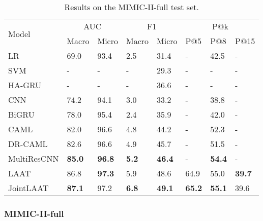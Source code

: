 \documentclass{article}
\begin{document}
\begingroup
\setlength{\tabcolsep}{2.5pt} \renewcommand{\arraystretch}{1.1} \begin{table}[!t]

\centering\small
\begin{tabular}{l|ll|ll|lll}
\hline
 \multirow{2}{*}{{Model}} &
 \multicolumn{2}{c|}{{AUC}} & \multicolumn{2}{c|}{{F1}} & \multicolumn{3}{c}{{P@k}} \\ \cline{2-8}

 &   Macro     & Micro &    Macro &     Micro & P@5 &  P@8 & P@15 \\ \hline
LR & 69.0 & 93.4 & 2.5 & 31.4 & - & 42.5 & - \\
SVM& - & - & - & 29.3 & - & - & - \\\hline
HA-GRU & - & - & - & 36.6 & - & - & - \\
CNN & 74.2 & 94.1 & 3.0 & 33.2 & - & 38.8 & - \\
BiGRU & 78.0 & 95.4 & 2.4 & 35.9 & - & 42.0 & - \\
CAML & 82.0 & 96.6 & 4.8 & 44.2 & - & 52.3 & - \\
DR-CAML & 82.6 & 96.6 & 4.9 & 45.7 & - & 51.5 & - \\
MultiResCNN & \textbf{85.0} & \textbf{96.8} & \textbf{5.2} & \textbf{46.4} & - & \textbf{54.4} & - \\\hline\hline
LAAT  & 86.8 & \textbf{97.3} & 5.9 & 48.6 & 64.9 & 55.0 & \textbf{39.7} \\
JointLAAT  & \textbf{87.1} & 97.2 & \textbf{6.8} & \textbf{49.1} & \textbf{65.2} & \textbf{55.1} & 39.6\\
\hline
\end{tabular}
\caption{Results on the MIMIC-II-full test set.}
\label{tbl:mimicii-full}
\end{table}
\endgroup


\subsubsection{MIMIC-II-full} 
\end{document}
